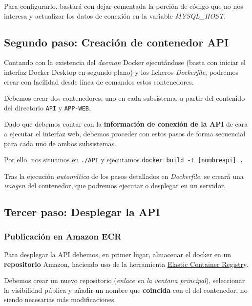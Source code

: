 Para configurarlo, bastará con dejar comentada la porción de código que no nos interesa y actualizar los datos de conexión en la variable \textit{MYSQL\_HOST}.


\subsection{Segundo paso: Creación de contenedor API}

Contando con la existencia del \textit{daemon} Docker ejecutándose (basta con iniciar el interfaz Docker Desktop en segundo plano) y los ficheros \textit{Dockerfile}, podremos crear con facilidad desde línea de comandos estos contenedores.

Debemos crear dos contenedores, uno en cada subsistema, a partir del contenido del directorio \texttt{API} y \texttt{APP-WEB}.

Dado que debemos contar con la \textbf{información de conexión de la API} de cara a ejecutar el interfaz web, debemos proceder con estos pasos de forma secuencial para cada uno de ambos subsistemas.

Por ello, nos situamos en \texttt{./API} y ejecutamos \texttt{docker build -t [nombreapi] .}

Tras la ejecución \textit{automática} de los pasos detallados en \textit{Dockerfile}, se creará una \textit{imagen} del contenedor, que podremos ejecutar o desplegar en un servidor.


\subsection{Tercer paso: Desplegar la API}

\subsubsection{Publicación en Amazon ECR}

Para desplegar la API debemos, en primer lugar, almacenar el docker en un \textbf{repositorio} Amazon, haciendo uso de la herramienta \href{https://aws.amazon.com/es/ecr/}{Elastic Container Registry}.

Debemos crear un nuevo repositorio (\textit{enlace en la ventana principal}), seleccionar la visibilidad pública y añadir un nombre que \textbf{coincida} con el del contenedor, no siendo necesarias más modificaciones.

